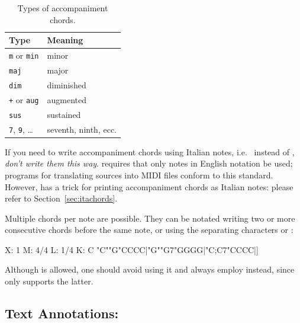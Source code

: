 \documentclass[a4paper,12pt]{book}
\begin{document}

\begin{table}
\begin{center}
\begin{tabular}{ll}
\toprule %
\textbf{Type} & \textbf{Meaning} \\
\midrule %
\texttt{m} or \texttt{min} & minor \\
\texttt{maj} & major \\
\texttt{dim} & diminished \\
\texttt{+} or \texttt{aug} & augmented \\
\texttt{sus} & sustained \\
\texttt{7}, \texttt{9}, {\ldots} & seventh, ninth, ecc. \\
\bottomrule %
\end{tabular}
\caption{Types of accompaniment chords.}
\label{tab:chords}
\end{center}
\end{table}

\begin{vimp}

  If you need to write accompaniment chords using Italian notes, i.e.\
   instead of , \emph{don't write them this
  way}. \ABC{} requires that only notes in English notation be
  used; programs for translating sources into MIDI files conform to
  this standard. However, \abcm{} has a trick for printing
  accompaniment chords as Italian notes: please refer to
  Section~\ref{sec:itachords}.

\end{vimp}

Multiple chords per note are possible. They can be notated writing two
or more consecutive chords before the same note, or using the
separating characters \car{;} or :

\begin{abcsource}
X: 1
M: 4/4
L: 1/4
K: C
%
"C""G"CCCC|"G""G7"GGGG|"C;C7"CCCC|]
\end{abcsource}


Although  is allowed, one should avoid using it and always
employ \car{;} instead, since \abcmid{} only supports the latter.


\subsection{Text Annotations: }
\end{document}
